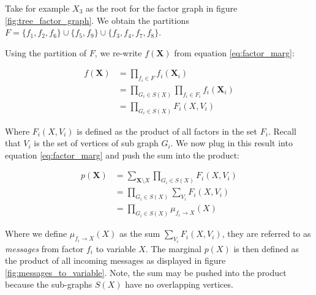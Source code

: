 \begin{exmp}
Take for example $X_3$ as the root for the factor graph in
figure \ref{fig:tree_factor_graph}. We obtain the partitions
$F = \{f_1, f_2, f_6\} \cup \{f_5, f_9\} \cup \{f_3, f_4, f_7, f_8\}$.
\end{exmp}

\noindent
Using the partition of $F$, we re-write $f(\textbf{X})$ from equation
\ref{eq:factor_marg}:

\begin{equation}\begin{split}
f(\textbf{X}) 
	&= \prod_{f_i \in F} f_i(\textbf{X}_i) \\
	&= \prod_{G_i \in S(X)}\prod_{f_i \in F_i} f_i(\textbf{X}_i)\\
	&= \prod_{G_i \in S(X)}F_i(X, V_i)
\end{split}\end{equation}

\noindent
Where $F_i(X, V_i)$ is defined as the product of
all factors in the set $F_i$. Recall that $V_i$ is the set of vertices
of sub graph $G_i$. We now plug in this result into equation
\ref{eq:factor_marg} and push the sum into the product:

\begin{equation}\begin{split}
p(\textbf{X}) 
	&= \sum_{\textbf{X}\setminus X} \prod_{G_i \in S(X)} F_i(X, V_i) \\
	&= \prod_{G_i \in S(X)} \sum_{V_i} F_i(X, V_i) \\
	&= \prod_{G_i \in S(X)} \mu_{f_i \rightarrow X}(X)
\end{split}\end{equation}

\noindent
Where we define $\mu_{f_i \rightarrow X}(X)$ as the sum
$\sum_{V_i} F_i(X, V_i)$, they are referred to as \textit{messages}
from factor $f_i$ to variable $X$. The marginal $p(X)$ is then
defined as the product of all incoming messages as displayed
in figure \ref{fig:messages_to_variable}.
Note, the sum may be pushed into the product
because the sub-graphs $S(X)$ have no overlapping vertices.

